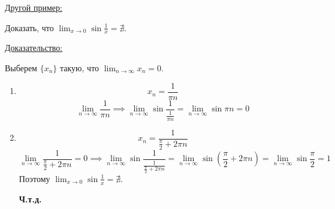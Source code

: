 \documentclass[12pt]{article}
\def\posl#1#2{\{#1_{#2}\}}
\begin{document}
    \underline{Другой пример:}
    \begin{adjustwidth}{1.5em}{1.5em}
        Доказать, что $\lim_{x\to0}\sin\frac{1}{x} = \nexists$.\par\noindent
        \underline{Доказательство:}
        \begin{adjustwidth}{1.5em}{1.5em}
            Выберем $\posl{x}{n}$ такую, что $\lim_{n\to\infty}x_n = 0$.\\
            \begin{enumerate}
                \item \[x_n = \frac{1}{\pi n}\]
                \[ \lim_{n\to\infty}\frac{1}{\pi n} \implies \lim_{n\to\infty}\sin \frac{1}{\frac{1}{\pi n}} = \lim_{n\to\infty}\sin \pi n = 0 \]
                \item \[x_n = \frac{1}{\frac{\pi}{2} + 2\pi n}\]
                \[ \lim_{n\to\infty}\frac{1}{\frac{\pi}{2} + 2\pi n} = 0 \implies \lim_{n\to\infty}\sin \frac{1}{\frac{1}{\frac{\pi}{2} + 2\pi n}} = \lim_{n\to\infty} \sin(\frac{\pi}{2} + 2\pi n) = \lim_{n\to\infty}\sin \frac{\pi}{2} = 1 \]
                Поэтому $\lim_{x\to 0}\sin \frac{1}{x} = \nexists$.
                \begin{center}
                    \textbf{Ч.т.д.}
                \end{center}
            \end{enumerate}
        \end{adjustwidth}
    \end{adjustwidth}
    
\end{document}
